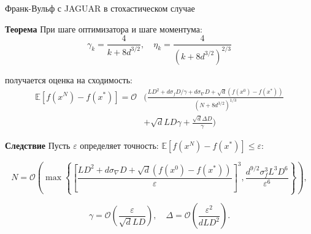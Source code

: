 \documentclass{beamer}
\newcommand{\expect}[1]{\mathbb{E}\left[ #1 \right]}
\newcommand{\norms}[1]{\left\| #1 \right\|}
\begin{document}
    
            


\begin{frame}{Франк-Вульф с JAGUAR в стохастическом случае}

    \textbf{Теорема} При шаге оптимизатора и шаге моментума:
        \begin{equation*}
            \gamma_k = \frac{4}{k + 8d^{3/2}}, \quad \eta_k = \frac{4}{(k + 8d^{3/2})^{2/3}}
        \end{equation*}
            
        получается оценка на сходимость:
        \small{
             \begin{align*}
                    \mathbb{E}\left[f(x^{N}) - f(x^*) \right] = \mathcal{O}
                    &\Bigg(
                    \frac{L D^2 + d \sigma_f D/ \gamma + d \sigma_{\nabla} D + \sqrt{d} (f(x^0) - f(x^*))}{(N + 8d^{3/2})^{1/3}} \\
                    &+
                    \sqrt{d} L D \gamma + \frac{\sqrt{d} \Delta D}{\gamma} \Bigg)
             \end{align*}
        }

        \textbf{Следствие} Пусть $\varepsilon$ определяет точность: $\expect{f(x^N) - f(x^*)} \leq \varepsilon$:

        \begin{equation*}
            N = \mathcal{O} \left( \max\left\{ \left[ \frac{L D^2 + d\sigma_{\nabla} D + \sqrt{d} (f(x^0) - f(x^*))}{\varepsilon}\right]^3 , \frac{d^{9/2} \sigma_f^3 L^3D^6}{\varepsilon^6} \right\}\right),
        \end{equation*}
        
        \begin{equation*}
            \gamma = \mathcal{O} \left(\frac{\varepsilon}{\sqrt{d} L D} \right), \quad
            \Delta = \mathcal{O} \left( \frac{\varepsilon^2}{d L D^2}\right).
        \end{equation*}
            
\end{frame}
\end{document}
